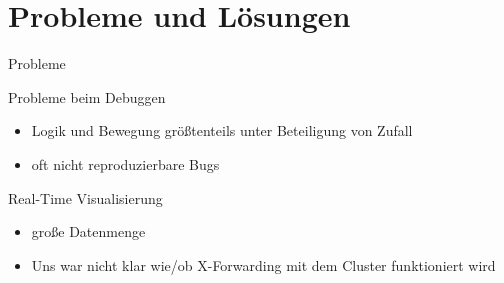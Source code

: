 \section{Probleme und Lösungen}

\begin{frame}{Probleme}
	\begin{block}{Probleme beim Debuggen}
		\begin{itemize}
			\item Logik und Bewegung größtenteils unter Beteiligung von Zufall
			\item oft nicht reproduzierbare Bugs 
		\end{itemize}
	\end{block}
	
	\begin{block} {Real-Time Visualisierung}
		\begin{itemize}
			\item große Datenmenge
			\item Uns war nicht klar wie/ob X-Forwarding mit dem Cluster funktioniert wird
		\end{itemize}
	\end{block}
\end{frame}
